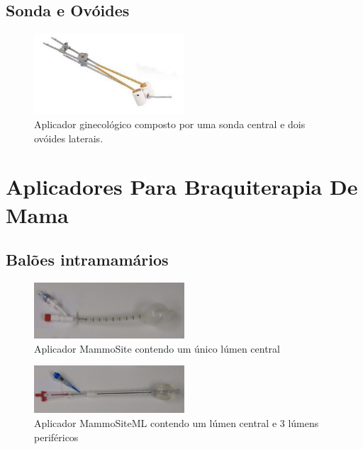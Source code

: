 \documentclass[11pt,a4paper]{article}
\begin{document}
        \subsection{Sonda e Ovóides}
        
            \begin{figure}[h]
                \centering
                \includegraphics[width=0.5\textwidth]{Imagens/aplicadorSondaEOvoides.jpg}
                \caption{Aplicador ginecológico composto por uma sonda central e dois ovóides laterais.}
            \end{figure}

    \pagebreak
    \section{Aplicadores Para Braquiterapia De Mama}

        \subsection{Balões intramamários}

            \begin{figure}[h]
                \centering
                \includegraphics[width=0.5\textwidth]{Imagens/aplicadorMammoSite2.jpg}
                \caption{Aplicador MammoSite contendo um único lúmen central}
            \end{figure}

            \begin{figure}[h]
                \centering
                \includegraphics[width=0.5\textwidth]{Imagens/aplicadorMammositeML.JPG}
                \caption{Aplicador MammoSiteML contendo um lúmen central e 3 lúmens periféricos}
            \end{figure}
\end{document}
